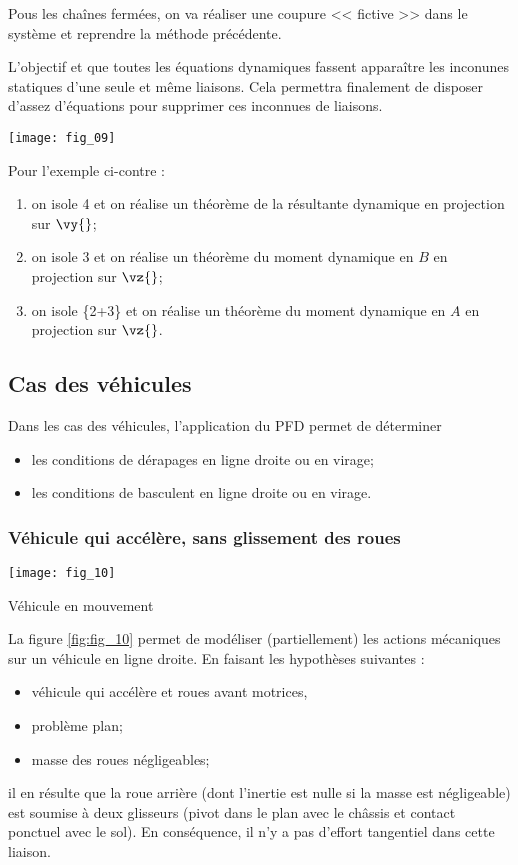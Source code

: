 Pous les chaînes fermées, on va réaliser une coupure << fictive >> dans le système et reprendre la méthode précédente. 

L'objectif et que toutes les équations dynamiques fassent apparaître les inconunes statiques d'une seule et même liaisons. Cela permettra finalement de disposer d'assez d'équations pour supprimer ces inconnues de liaisons.

\begin{marginfigure}
\texttt{[image: fig\_09]}
\end{marginfigure}

Pour l'exemple ci-contre : 
\begin{enumerate}
\item on isole 4 et on réalise un théorème de la résultante dynamique en projection sur $\vy{}$;
\item on isole 3 et on réalise un théorème du moment dynamique en $B$ en projection sur $\vz{}$;
\item on isole \{2+3\} et on réalise un théorème du moment dynamique en $A$ en projection sur $\vz{}$.
\end{enumerate}



\subsection{Cas des véhicules}
Dans les cas des véhicules, l'application du PFD permet de déterminer 
\begin{itemize}
\item les conditions de dérapages en ligne droite ou en virage;
\item les conditions de basculent en ligne droite ou en virage.
\end{itemize}

\subsubsection{Véhicule qui accélère, sans glissement des roues}

\begin{marginfigure}
\texttt{[image: fig\_10]}
\caption{Véhicule en mouvement \label{fig:fig_10}}
\end{marginfigure}

La figure \ref{fig:fig_10} permet de modéliser (partiellement) les actions mécaniques sur un véhicule en ligne droite.  En faisant les hypothèses suivantes : 
\begin{itemize}
\item véhicule qui accélère et roues avant motrices, 
\item problème plan;
\item masse des roues négligeables;
\end{itemize}
il en résulte que la roue arrière (dont l'inertie est nulle si la masse est négligeable) est soumise à deux glisseurs (pivot dans le plan avec le châssis et contact ponctuel avec le sol). En conséquence, il n'y a pas d'effort tangentiel dans cette liaison. 

